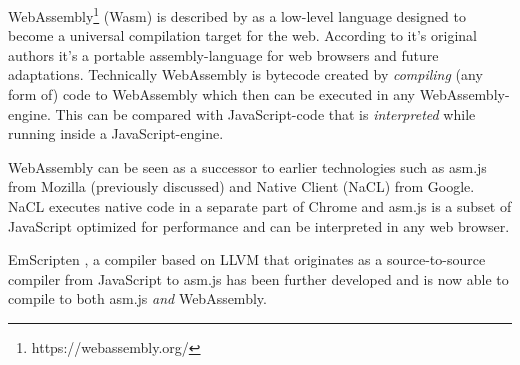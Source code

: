 
WebAssembly\footnote{https://webassembly.org/} (Wasm) is described by \textcite{Watt2018,JangdaPowersGuhaBerger2019} as a low-level language designed to become a universal compilation target for the web. According to it's original authors \textcite{HaasRossbergSchuffTitzerHolmanGohmanWagnerZakaiBastien2017} it's a portable assembly-language for web browsers and future adaptations. Technically WebAssembly is bytecode created by \emph{compiling} (any form of) code to WebAssembly \parencite{Watt2018} which then can be executed in any WebAssembly-engine. This can be compared with JavaScript-code that is \emph{interpreted} while running inside a JavaScript-engine.

WebAssembly can be seen as a successor to earlier technologies such as asm.js from Mozilla (previously discussed) and Native Client (NaCL) from Google. NaCL executes native code in a separate part of Chrome and asm.js  \parencite{Zakai2018} is a subset of JavaScript optimized for performance \parencite{VanEsNicolayStievenartDHondtDeRoover2016} and can be interpreted in any web browser.




EmScripten \parencite{Zakai2011}, a compiler based on LLVM \parencite{LattnerAdve2014} that originates as a source-to-source compiler from JavaScript to asm.js \parencite{Zakai2011} has been further developed \parencite{HaasRossbergSchuffTitzerHolmanGohmanWagnerZakaiBastien2017} and is now able to compile to both asm.js \emph{and} WebAssembly.

